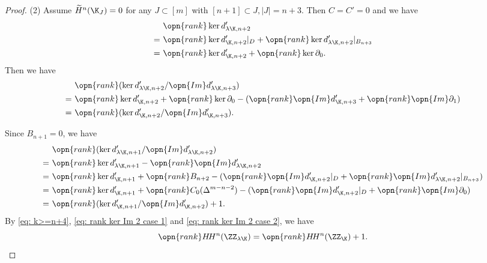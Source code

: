 \begin{proof}
(2) Assume $\widetilde{H}^n(\K_J)=0$ 
for any $J\subset [m]$ with $[n+1]\subset J,|J|=n+3$.
Then $C=C'=0$ and we have
\begin{equation*}
    \begin{split}
        & \ \opn{rank} \ker d'_{\lambda\K,n+2}\\
        = & \  \opn{rank} \ker d'_{\K,n+2}|_D
        + \opn{rank} \ker d'_{\lambda\K,n+2}|_{B_{n+3}}\\
        = & \  \opn{rank} \ker d'_{\K,n+2}
        + \opn{rank} \ker \partial_0.\\
    \end{split}
\end{equation*}
Then we have
\begin{equation}
    \label{eq: rank ker Im 2 case 1}
    \begin{split}
        & \ \opn{rank} (\ker d'_{\lambda\K,n+2}/\opn{Im} d'_{\lambda\K,n+3})\\
        = & \ \opn{rank} \ker d'_{\K,n+2}
         + \opn{rank} \ker \partial_0
         - ( \opn{rank} \opn{Im} d'_{\K,n+3} + \opn{rank} \opn{Im} \partial_1 )\\
         = & \ \opn{rank} (\ker d'_{\K,n+2}/\opn{Im} d'_{\K,n+3}).\\
    \end{split}
\end{equation}

Since $B_{n+1}=0$, we have
\begin{equation}
    \label{eq: rank ker Im 2 case 2}
    \begin{split}
         & \ \opn{rank} (\ker d'_{\lambda\K,n+1}/\opn{Im} d'_{\lambda\K,n+2})\\
        = & \ \opn{rank} \ker d'_{\lambda\K,n+1}-
        \opn{rank} \opn{Im} d'_{\lambda\K,n+2}\\
        = & \ \opn{rank} \ker d'_{\K,n+1}+\opn{rank} B_{n+2}
        -
        (\opn{rank} \opn{Im} d'_{\K,n+2}|_D+
        \opn{rank} \opn{Im}
        d'_{\lambda\K,n+2}|_{B_{n+3}})\\
        = & \ \opn{rank} \ker d'_{\K,n+1}+\opn{rank} C_0(\Delta^{m-n-2})-
        (\opn{rank} \opn{Im} d'_{\K,n+2}|_D+
        \opn{rank}\opn{Im}\partial_0)\\
        = & \ \opn{rank} (\ker d'_{\K,n+1}/\opn{Im} d'_{\K,n+2})+1.
    \end{split}
\end{equation}
By \eqref{eq: k>=n+4}, \eqref{eq: rank ker Im 2 case 1} and \eqref{eq: rank ker Im 2 case 2}, we have
$$\opn{rank} H\!H^n(\ZZ_{\lambda\K})=\opn{rank} H\!H^n
(\ZZ_{\K})+1.$$

\end{proof}


